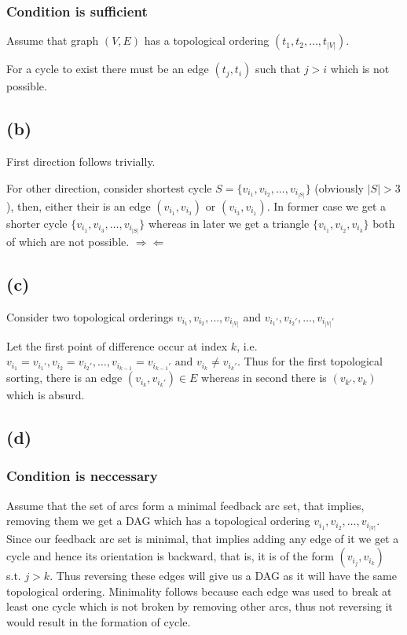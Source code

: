 \documentclass[12pt,3p]{elsarticle}
\newcommand{\contradiction}{
  \Rightarrow\!\Leftarrow
}
\begin{document}
\subsubsection{Condition is sufficient}

Assume that graph $(V, E)$ has a topological ordering $(t_1, t_2, \dots, t_{|V|})$.

For a cycle to exist there must be an edge $(t_j, t_i)$ such that $j > i$ which is not possible.

\subsection{(b)}

First direction follows trivially.

For other direction, consider shortest cycle $S = \{v_{i_1}, v_{i_2}, \dots, v_{i_{|S|}}\}$ (obviously $|S| > 3$), then, either their is an edge $(v_{i_1}, v_{i_3}) \text{ or } (v_{i_3}, v_{i_1})$. In former case we get a shorter cycle $\{v_{i_1}, v_{i_3}, \dots, v_{i_{|S|}}\}$ whereas in later we get a triangle $\{v_{i_1}, v_{i_2}, v_{i_3}\}$ both of which are not possible. $\contradiction$

\subsection{(c)}

Consider two topological orderings $v_{i_1}, v_{i_2}, \dots, v_{i_{|V|}}$ and $v_{i_1'}, v_{i_2'}, \dots, v_{i_{|V|}'}$ 

Let the first point of difference occur at index $k$, i.e. $v_{i_1} = v_{i_1'}, v_{i_2} = v_{i_2'}, \dots, v_{i_{k - 1}} = v_{i_{k - 1}'} \text{ and } v_{i_k} \neq v_{i_k'}$. Thus for the first topological sorting, there is an edge $(v_{i_k}, v_{i_k'}) \in E$ whereas in second there is $(v_{k'}, v_{k})$ which is absurd.

\subsection{(d)}

\subsubsection{Condition is neccessary}

Assume that the set of arcs form a minimal feedback arc set, that implies, removing them we get a DAG which has a topological ordering $v_{i_1}, v_{i_2}, \dots, v_{i_{|V|}}$. Since our feedback arc set is minimal, that implies adding any edge of it we get a cycle and hence its orientation is backward, that is, it is of the form $(v_{i_j}, v_{i_k})$ s.t. $j > k$. Thus reversing these edges will give us a DAG as it will have the same topological ordering. Minimality follows because each edge was used to break at least one cycle which is not broken by removing other arcs, thus not reversing it would result in the formation of cycle.
\end{document}
